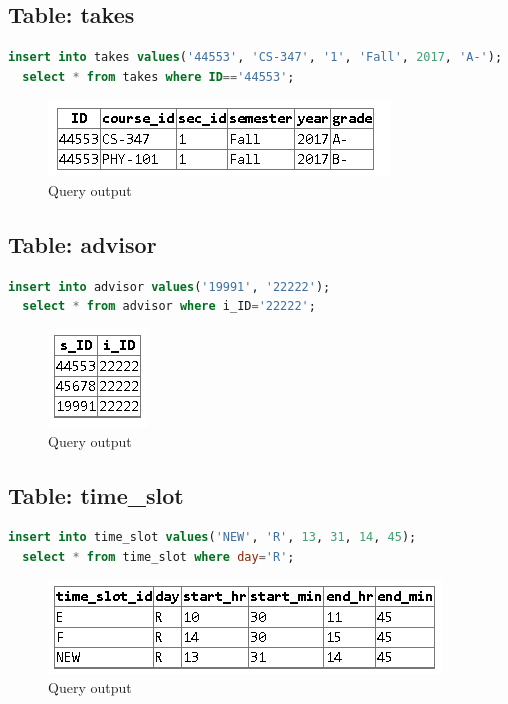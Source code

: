 \documentclass{article}
\begin{document}
\subsection{Table: takes}
\begin{lstlisting}[language=sql]
  insert into takes values('44553', 'CS-347', '1', 'Fall', 2017, 'A-');
  select * from takes where ID=='44553';
\end{lstlisting}
\begin{figure}[!ht]
  \begin{center}
  \includegraphics[scale=1]{takes.png}
  \caption{Query output}
  \end{center}
\end{figure}

\newpage
\subsection{Table: advisor}
\begin{lstlisting}[language=sql]
  insert into advisor values('19991', '22222');
  select * from advisor where i_ID='22222';
\end{lstlisting}
\begin{figure}[!ht]
  \begin{center}
  \includegraphics[scale=1]{adv.png}
  \caption{Query output}
  \end{center}
\end{figure}

\subsection{Table: time\_slot}
\begin{lstlisting}[language=sql]
  insert into time_slot values('NEW', 'R', 13, 31, 14, 45);
  select * from time_slot where day='R';
\end{lstlisting}
\begin{figure}[!ht]
  \begin{center}
  \includegraphics[scale=1]{time_slot.png}
  \caption{Query output}
  \end{center}
\end{figure}
\end{document}
